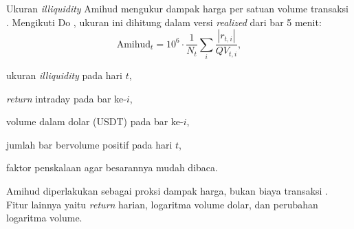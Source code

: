 Ukuran \textit{illiquidity} Amihud mengukur dampak harga per satuan volume
transaksi \cite{amihud2002}. Mengikuti Do \cite{do2026}, ukuran ini dihitung
dalam versi \textit{realized} dari bar 5 menit:
\begin{equation}
  \text{Amihud}_t = 10^6 \cdot \frac{1}{N_t}\sum_{i}
  \frac{\left|r_{t,i}\right|}{QV_{t,i}},
  \label{eq:amihud}
\end{equation}
\begin{keterangan}
  \item[$\text{Amihud}_t$] ukuran \textit{illiquidity} pada hari $t$,
  \item[$r_{t,i}$] \textit{return} intraday pada bar ke-$i$,
  \item[$QV_{t,i}$] volume dalam dolar (USDT) pada bar ke-$i$,
  \item[$N_t$] jumlah bar bervolume positif pada hari $t$,
  \item[$10^6$] faktor penskalaan agar besarannya mudah dibaca.
\end{keterangan}
Amihud diperlakukan sebagai proksi dampak harga, bukan
biaya transaksi \cite{amihud2002,brauneis2021}. Fitur lainnya yaitu
\textit{return} harian, logaritma volume dolar, dan perubahan logaritma volume.


